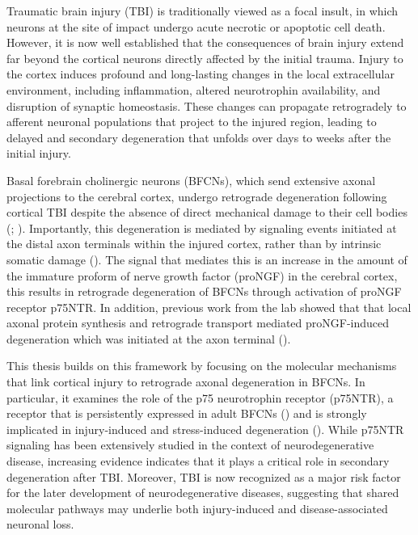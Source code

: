 \documentclass[
  letterpaper,
  DIV=11,
  numbers=noendperiod]{scrreprt}
\begin{document}
Traumatic brain injury (TBI) is traditionally viewed as a focal insult,
in which neurons at the site of impact undergo acute necrotic or
apoptotic cell death. However, it is now well established that the
consequences of brain injury extend far beyond the cortical neurons
directly affected by the initial trauma. Injury to the cortex induces
profound and long-lasting changes in the local extracellular
environment, including inflammation, altered neurotrophin availability,
and disruption of synaptic homeostasis. These changes can propagate
retrogradely to afferent neuronal populations that project to the
injured region, leading to delayed and secondary degeneration that
unfolds over days to weeks after the initial injury.

Basal forebrain cholinergic neurons (BFCNs), which send extensive axonal
projections to the cerebral cortex, undergo retrograde degeneration
following cortical TBI despite the absence of direct mechanical damage
to their cell bodies (;
). Importantly, this degeneration is mediated by signaling events
initiated at the distal axon terminals within the injured cortex, rather
than by intrinsic somatic damage
(). The signal that mediates this is an increase in the amount of
the immature proform of nerve growth factor (proNGF) in the cerebral
cortex, this results in retrograde degeneration of BFCNs through
activation of proNGF receptor p75NTR. In addition, previous work from
the lab showed that that local axonal protein synthesis and retrograde
transport mediated proNGF-induced degeneration which was initiated at
the axon terminal
().

This thesis builds on this framework by focusing on the molecular
mechanisms that link cortical injury to retrograde axonal degeneration
in BFCNs. In particular, it examines the role of the p75 neurotrophin
receptor (p75NTR), a receptor that is persistently expressed in adult
BFCNs () and is strongly
implicated in injury-induced and stress-induced degeneration
(). While p75NTR signaling has
been extensively studied in the context of neurodegenerative disease,
increasing evidence indicates that it plays a critical role in secondary
degeneration after TBI. Moreover, TBI is now recognized as a major risk
factor for the later development of neurodegenerative diseases,
suggesting that shared molecular pathways may underlie both
injury-induced and disease-associated neuronal loss.
\end{document}
